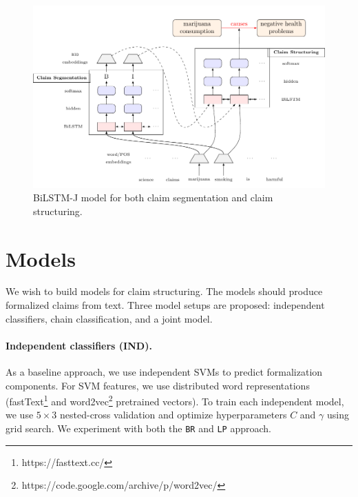 \begin{figure}
	\includegraphics{joint_tikz-figure0.pdf}
	\caption{BiLSTM-J model for both claim segmentation and claim 
	structuring. }
	\label{fig:joint_model}
\end{figure}

\section{Models}
\label{sec:claim_struc_models}

We wish to build models for claim structuring. The models should produce 
formalized claims from text. 
Three model setups are proposed: independent classifiers, 
chain classification, and a joint model. 

\paragraph{Independent classifiers (IND). }
As a baseline approach, we use independent SVMs to predict formalization
components.
For SVM features, we use distributed word representations
(fastText\footnote{https://fasttext.cc/}
and word2vec\footnote{https://code.google.com/archive/p/word2vec/}
pretrained vectors).
To train each independent model, we use $5 \times 3$ nested-cross validation
and optimize hyperparameters $C$ and $\gamma$ using grid search. 
We experiment with both the \texttt{BR} and \texttt{LP} approach.


